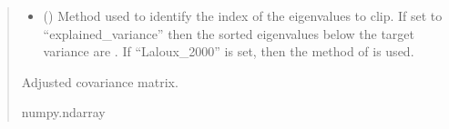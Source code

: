 \documentclass[letterpaper,10pt,english]{sphinxmanual}
\begin{document}
\begin{fulllineitems}
\begin{quote}
\begin{description}
\begin{itemize}
\item {}
\sphinxAtStartPar
{} (\sphinxstyleliteralemphasis{\sphinxupquote{ | }}) \textendash{} Method used to identify the index of the eigenvalues to clip. If set to
“explained\_variance” then the sorted eigenvalues below the target
variance are . If “Laloux\_2000” is set, then the method of
 is used.

\end{itemize}

\sphinxAtStartPar
{} \textendash{} Adjusted covariance matrix.

\sphinxAtStartPar
numpy.ndarray

\end{description}\end{quote}

\end{fulllineitems}

\end{document}
